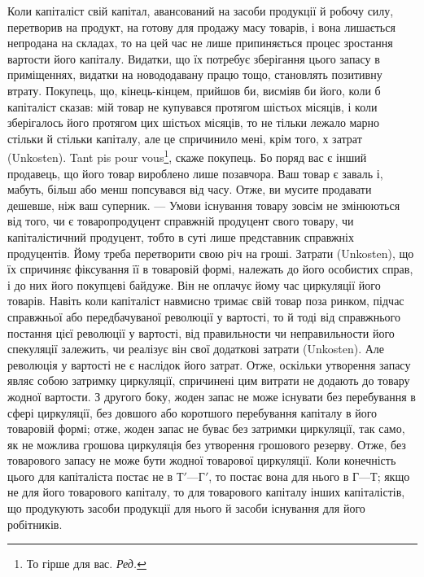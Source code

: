 Коли капіталіст свій капітал, авансований на засоби продукції й робочу
силу, перетворив на продукт, на готову для продажу масу товарів, і вона
лишається непродана на складах, то на цей час не лише припиняється
процес зростання вартости його капіталу. Видатки, що їх потребує зберігання
цього запасу в приміщеннях, видатки на новододавану працю тощо, становлять
позитивну втрату. Покупець, що, кінець-кінцем, прийшов би, висміяв
би його, коли б капіталіст сказав: мій товар не купувався протягом шістьох
місяців, і коли зберігалось його протягом цих шістьох місяців, то не
тільки лежало марно стільки й стільки капіталу, але це спричинило мені,
крім того, х затрат (Unkosten). Tant pis pour vous\footnote*{
То гірше для вас. \emph{Ред.}
}, скаже покупець. Бо
поряд вас є інший продавець, що його товар вироблено лише позавчора.
Ваш товар є заваль і, мабуть, більш або менш попсувався від часу. Отже,
ви мусите продавати дешевше, ніж ваш суперник. — Умови існування
товару зовсім не змінюються від того, чи є товаропродуцент справжній
продуцент свого товару, чи капіталістичний продуцент, тобто в суті
лише представник справжніх продуцентів. Йому треба перетворити свою
річ на гроші. Затрати (Unkosten), що їх спричиняє фіксування її
в товаровій формі, належать до його особистих справ, і до них його
покупцеві байдуже. Він не оплачує йому час циркуляції його товарів.
Навіть коли капіталіст навмисно тримає свій товар поза ринком, підчас
справжньої або передбачуваної революції у вартості, то й тоді від
справжнього постання цієї революції у вартості, від правильности чи
неправильности його спекуляції залежить, чи реалізує він свої додаткові
затрати (Unkosten). Але революція у вартості не є наслідок його затрат.
Отже, оскільки утворення запасу являє собою затримку циркуляції, спричинені
цим витрати не додають до товару жодної вартости. З другого
боку, жоден запас не може існувати без перебування в сфері циркуляції,
без довшого або коротшого перебування капіталу в його товаровій
формі; отже, жоден запас не буває без затримки циркуляції, так само,
як не можлива грошова циркуляція без утворення грошового резерву.
Отже, без товарового запасу не може бути жодної товарової циркуляції.
Коли конечність цього для капіталіста постає не в $Т' — Г'$, то постає
вона для нього в $Г — Т$; якщо не для його товарового капіталу, то
для товарового капіталу інших капіталістів, що продукують засоби продукції
для нього й засоби існування для його робітників.

